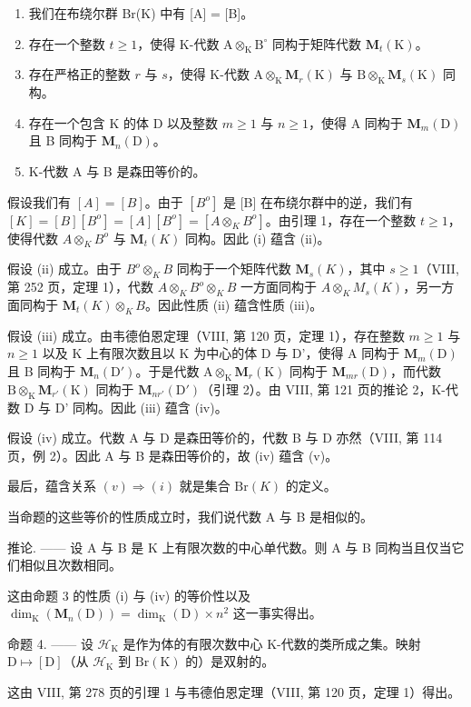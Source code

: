 \begin{enumerate}
\def\labelenumi{(\roman{enumi})}
\item
  我们在布绕尔群 Br(K) 中有 {[}A{]} = {[}B{]}。
\item
  存在一个整数 \(t \geqslant 1\)，使得 K-代数 \(\mathrm{A} \otimes_{\mathrm{K}} \mathrm{B}^{\circ}\) 同构于矩阵代数 \(\mathbf{M}_t(\mathrm{K})\)。
\item
  存在严格正的整数 \(r\) 与 \(s\)，使得 K-代数 \(\mathrm{A} \otimes_{\mathrm{K}} \mathbf{M}_r(\mathrm{K})\) 与 \(\mathrm{B} \otimes_{\mathrm{K}} \mathbf{M}_s(\mathrm{K})\) 同构。
\item
  存在一个包含 K 的体 D 以及整数 \(m \geqslant 1\) 与 \(n \geqslant 1\)，使得 A 同构于 \(\mathbf{M}_{m}(\mathrm{D})\) 且 B 同构于 \(\mathbf{M}_{n}(\mathrm{D})\)。
\item
  K-代数 A 与 B 是森田等价的。
\end{enumerate}

假设我们有 \([A]=[B]\)。由于 \([B^{o}]\) 是 {[}B{]} 在布绕尔群中的逆，我们有 \([K]=[B][B^{o}]=[A][B^{o}]=[A\otimes_{K}B^{o}]\)。由引理 1，存在一个整数 \(t\geqslant1\)，使得代数 \(A\otimes_{K}B^{o}\) 与 \(\mathbf{M}_{t}(K)\) 同构。因此 (i) 蕴含 (ii)。

假设 (ii) 成立。由于 \(B^{o} \otimes_{K} B\) 同构于一个矩阵代数 \(\mathbf{M}_{s}(K)\)，其中 \(s \geqslant 1\)（VIII, 第 252 页，定理 1），代数 \(A \otimes_{K} B^{o} \otimes_{K} B\) 一方面同构于 \(A \otimes_{K} M_{s}(K)\)，另一方面同构于 \(\mathbf{M}_{t}(K) \otimes_{K} B\)。因此性质 (ii) 蕴含性质 (iii)。

假设 (iii) 成立。由韦德伯恩定理（VIII, 第 120 页，定理 1），存在整数 \(m \geqslant 1\) 与 \(n \geqslant 1\) 以及 K 上有限次数且以 K 为中心的体 D 与 D'，使得 A 同构于 \(\mathbf{M}_m(\mathrm{D})\) 且 B 同构于 \(\mathbf{M}_n(\mathrm{D}')\)。于是代数 \(\mathrm{A} \otimes_{\mathrm{K}} \mathbf{M}_r(\mathrm{K})\) 同构于 \(\mathbf{M}_{mr}(\mathrm{D})\)，而代数 \(\mathrm{B} \otimes_{\mathrm{K}} \mathbf{M}_{r'}(\mathrm{K})\) 同构于 \(\mathbf{M}_{nr'}(\mathrm{D}')\)（引理 2）。由 VIII, 第 121 页的推论 2，K-代数 D 与 D' 同构。因此 (iii) 蕴含 (iv)。

假设 (iv) 成立。代数 A 与 D 是森田等价的，代数 B 与 D 亦然（VIII, 第 114 页，例 2）。因此 A 与 B 是森田等价的，故 (iv) 蕴含 (v)。

最后，蕴含关系 \((v)\Rightarrow(i)\) 就是集合 \(\mathrm{Br}(K)\) 的定义。

当命题的这些等价的性质成立时，我们说代数 A 与 B 是相似的。

推论. —— 设 A 与 B 是 K 上有限次数的中心单代数。则 A 与 B 同构当且仅当它们相似且次数相同。

这由命题 3 的性质 (i) 与 (iv) 的等价性以及 \(\dim_{\mathrm{K}}(\mathbf{M}_n(\mathrm{D})) = \dim_{\mathrm{K}}(\mathrm{D}) \times n^2\) 这一事实得出。

命题 4. —— 设 \(\mathcal{H}_{\mathrm{K}}\) 是作为体的有限次数中心 K-代数的类所成之集。映射 \(\mathrm{D} \mapsto [\mathrm{D}]\)（从 \(\mathcal{H}_{\mathrm{K}}\) 到 \(\mathrm{Br}(\mathrm{K})\) 的）是双射的。

这由 VIII, 第 278 页的引理 1 与韦德伯恩定理（VIII, 第 120 页，定理 1）得出。

